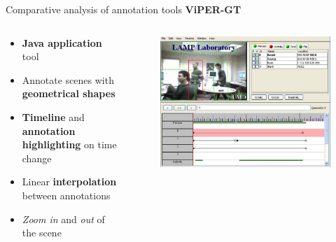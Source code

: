 \documentclass{beamer}
\begin{document}
\begin{tframe}{Comparative analysis of annotation tools}
\textbf{ViPER-GT} 
\begin{columns}[t] %
\begin{column}{.5\textwidth}
\begin{itemize}
\item \textbf{Java application} tool
\vspace{0.2cm}
\item Annotate scenes with \textbf{geometrical shapes}
\vspace{0.2cm}
\item \textbf{Timeline} and \textbf{annotation highlighting} on time change
\vspace{0.2cm}
\item Linear \textbf{interpolation} between annotations
\vspace{0.2cm}
\item \emph{Zoom in} and \emph{out} of the scene
\end{itemize}
\end{column}%
\begin{column}{.3\textwidth}
\begin{figure}[h]
\centering
\includegraphics[width=1\textwidth]{images/vipergt.jpg}
\end{figure}
\end{column}%
\end{columns}
\end{tframe}
\end{document}
